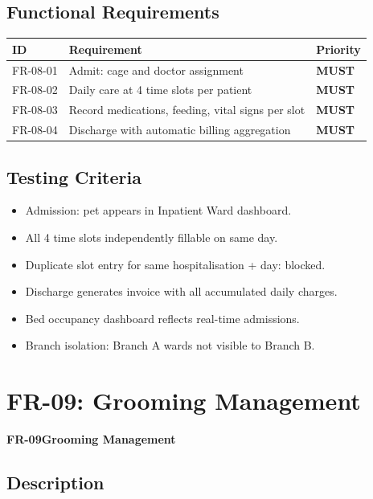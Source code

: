 \documentclass[12pt,a4paper]{report}
\newcommand{\must}{\colorbox{red!15}{\color{errorred}\textbf{\small MUST}}}
\newcommand{\testcheck}{\textcolor{successgreen}{\ding{51}}}
\newcommand{\moduleheader}[2]{%
  \par\vspace{6pt}%
  \noindent\colorbox{branddark}{\color{white}\textbf{\small #1}}\quad\textbf{\large #2}%
  \par\vspace{4pt}%
}
\begin{document}
\section{Functional Requirements}

\begin{longtable}{L{2.5cm} L{9cm} C{2cm}}
\toprule
\textbf{ID} & \textbf{Requirement} & \textbf{Priority} \\\midrule\endhead\bottomrule\endfoot
FR-08-01 & Admit: cage and doctor assignment & \must \\
FR-08-02 & Daily care at 4 time slots per patient & \must \\
FR-08-03 & Record medications, feeding, vital signs per slot & \must \\
FR-08-04 & Discharge with automatic billing aggregation & \must \\
\end{longtable}

\section{Testing Criteria}

\begin{itemize}
  \item[\testcheck] Admission: pet appears in Inpatient Ward dashboard.
  \item[\testcheck] All 4 time slots independently fillable on same day.
  \item[\testcheck] Duplicate slot entry for same hospitalisation + day: blocked.
  \item[\testcheck] Discharge generates invoice with all accumulated daily charges.
  \item[\testcheck] Bed occupancy dashboard reflects real-time admissions.
  \item[\testcheck] Branch isolation: Branch A wards not visible to Branch B.
\end{itemize}

\chapter{FR-09: Grooming Management}

\moduleheader{FR-09}{Grooming Management}

\section{Description}
\end{document}

